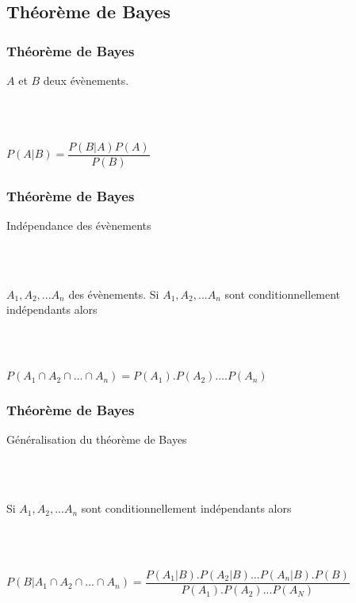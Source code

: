 \subsection{Théorème de Bayes}
	\begin{frame}
	\frametitle{Théorème de Bayes}
	\begin{center}
	\begin{LARGE}$A$ et $B$ deux évènements.\end{LARGE}\\\
	
	\begin{LARGE}$P(A|B)=\dfrac{P(B|A)P(A)}{P(B)}$\end{LARGE}
	\end{center}
	\end{frame}
	
	\begin{frame}
	\frametitle{Théorème de Bayes}
	\begin{LARGE}Indépendance des évènements\end{LARGE}\\\
	\begin{center}
	\begin{LARGE}$A_{1}, A_{2}, ...A_{n}$ des évènements. Si $A_{1}, A_{2}, ...A_{n}$ sont conditionnellement indépendants alors\end{LARGE}\\\
	\begin{LARGE}$P(A_{1}\cap A_{2}\cap ...\cap A_{n})=P(A_{1}).P(A_{2})....P(A_{n})$\end{LARGE}
	\end{center}
	\end{frame}
	
	\begin{frame}
	\frametitle{Théorème de Bayes}
	\begin{LARGE}Généralisation du théorème de Bayes\end{LARGE}\\\
	\begin{center}
	\begin{LARGE}Si $A_{1}, A_{2}, ...A_{n}$ sont conditionnellement indépendants alors\end{LARGE}\\\
	\begin{large}$P(B|A_{1}\cap A_{2}\cap...\cap A_{n})=\dfrac{P(A_{1}|B).P(A_{2}|B)...P(A_{n}|B).P(B)}{P(A_{1}).P(A_{2})...P(A_{N})}$\end{large}
	\end{center}
	\end{frame}
	

